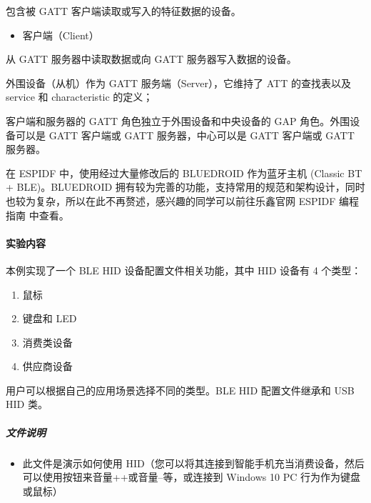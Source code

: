 \documentclass[a4paper,12pt,english]{sphinxmanual}
\begin{document}
{{\sphinxAtStartPar
包含被 GATT 客户端读取或写入的特征数据的设备。
\begin{itemize}
\item {} 
\sphinxAtStartPar
客户端（Client）

\end{itemize}

\sphinxAtStartPar
从 GATT 服务器中读取数据或向 GATT 服务器写入数据的设备。

\sphinxAtStartPar
外围设备（从机）作为 GATT 服务端（Server），它维持了 ATT 的查找表以及 service 和 characteristic 的定义；

\sphinxAtStartPar
客户端和服务器的 GATT 角色独立于外围设备和中央设备的 GAP 角色。外围设备可以是 GATT 客户端或 GATT 服务器，中心可以是 GATT 客户端或 GATT 服务器。

\sphinxAtStartPar
在 ESP\sphinxhyphen{}IDF 中，使用经过大量修改后的 BLUEDROID 作为蓝牙主机 (Classic BT + BLE)。BLUEDROID 拥有较为完善的功能，⽀持常用的规范和架构设计，同时也较为复杂，所以在此不再赘述，感兴趣的同学可以前往乐鑫官网 ESP\sphinxhyphen{}IDF 编程指南 中查看。


\paragraph{实验内容}
\label{\detokenize{exp-esp32/bluetooth/hid-device-gatt:id3}}
\sphinxAtStartPar
本例实现了一个 BLE HID 设备配置文件相关功能，其中 HID 设备有 4 个类型：
\begin{enumerate}
%
\item {} 
\sphinxAtStartPar
鼠标

\item {} 
\sphinxAtStartPar
键盘和 LED

\item {} 
\sphinxAtStartPar
消费类设备

\item {} 
\sphinxAtStartPar
供应商设备

\end{enumerate}

\sphinxAtStartPar
用户可以根据自己的应用场景选择不同的类型。BLE HID 配置文件继承和 USB HID 类。


\subparagraph{文件说明}
\label{\detokenize{exp-esp32/bluetooth/hid-device-gatt:id4}}\begin{itemize}
\item {} 
\sphinxAtStartPar
{} 此文件是演示如何使用 HID（您可以将其连接到智能手机充当消费设备，然后可以使用按钮来音量++或音量–等，或连接到 Windows 10 PC 行为作为键盘或鼠标）


\end{itemize}}}
\end{document}
